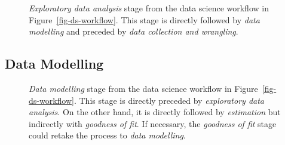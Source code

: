 \documentclass[
  letterpaper,
  DIV=11,
  numbers=noendperiod]{scrreprt}
\begin{document}
\begin{figure}


\caption{\label{fig-ds-workflow-eda}\emph{Exploratory data analysis}
stage from the data science workflow in Figure~\ref{fig-ds-workflow}.
This stage is directly followed by \emph{data modelling} and preceded by
\emph{data collection and wrangling}.}

\end{figure}%

\subsection{Data Modelling}\label{sec-ds-workflow-modelling}

\begin{figure}


\caption{\label{fig-ds-workflow-data-modelling}\emph{Data modelling}
stage from the data science workflow in Figure~\ref{fig-ds-workflow}.
This stage is directly preceded by \emph{exploratory data analysis}. On
the other hand, it is directly followed by \emph{estimation} but
indirectly with \emph{goodness of fit}. If necessary, the \emph{goodness
of fit} stage could retake the process to \emph{data modelling}.}

\end{figure}%
\end{document}
